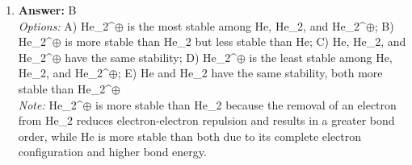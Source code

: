 \documentclass[12pt]{article}
\begin{document}
\begin{enumerate}[label=\arabic*.]
\item \textbf{Answer:} B
\\ \textit{Options:} A) He\_2^\ensuremath{\oplus} is the most stable among He, He\_2, and He\_2^\ensuremath{\oplus}; B) He\_2^\ensuremath{\oplus} is more stable than He\_2 but less stable than He; C) He, He\_2, and He\_2^\ensuremath{\oplus} have the same stability; D) He\_2^\ensuremath{\oplus} is the least stable among He, He\_2, and He\_2^\ensuremath{\oplus}; E) He and He\_2 have the same stability, both more stable than He\_2^\ensuremath{\oplus}
\\ \textit{Note:} He\_2^\ensuremath{\oplus} is more stable than He\_2 because the removal of an electron from He\_2 reduces electron-electron repulsion and results in a greater bond order, while He is more stable than both due to its complete electron configuration and higher bond energy.
\end{enumerate}
\end{document}

